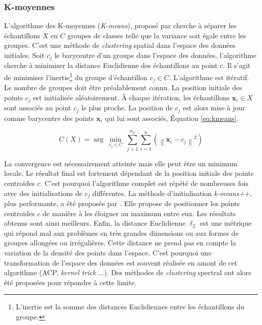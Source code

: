 \subsubsection{K-moyennes} \label{subsubsec:kmeans}
L'algorithme des K-moyennes (\textit{K-means}), proposé par \citeauthor{macqueen_methods_1967} \cite{macqueen_methods_1967, lloyd_least_1982} cherche à séparer les échantillons $X$ en $C$ groupes de classes telle que la variance soit égale entre les groupes.
C'est une méthode de \textit{clustering} spatial dans l'espace des données initiales.
Soit $c_j$ le barycentre d'un groupe dans l'espace des données, l'algorithme cherche à minimiser la distance Euclidienne des échantillons au point $c$.
Il s'agit de minimiser l'inertie\footnote{L'inertie est la somme des distances Euclidiennes entre les échantillons du groupe.} du groupe d'échantillon $c_j \in C$.
L'algorithme est itératif.
Le nombre de groupes doit être préalablement connu.
La position initiale des points $c_j$ est initialisée aléatoirement.
À chaque itération, les échantillons $\mathbf{x}_i \in X$ sont associés au point $c_j$ le plus proche.
La position de $c_j$ est alors mise à jour comme barycentre des points $\mathbf{x}_i$ qui lui sont associés, Équation \ref{eq:kmeans}.

\begin{equation} \label{eq:kmeans}
C(X) = \arg \ \min _{c_{j} \in C} \ \sum_{j=1}^{n_C} \sum_{i=1}^{n} \left(\left\|\mathbf{x}_{i}-c_{j}\right\|^{2}\right)
\end{equation}

La convergence est nécessairement atteinte mais elle peut être un minimum locale.
Le résultat final est fortement dépendant de la position initiale des points centroïdes $c$.
C'est pourquoi l'algorithme complet est répété de nombreuses fois avec des initialisations de $c_j$ différentes.
La méthode d'initialisation \textit{k-means++}, plus performante, a été proposée par \citeauthor{arthur_kmeans_2007} \cite{arthur_kmeans_2007}. Elle propose de positionner les points centroïdes $c$ de manière à les éloigner au maximum entre eux. Les résultats obtenus sont ainsi meilleurs.
Enfin, la distance Euclidienne $\ell_{2}$ est une métrique qui répond mal aux problèmes en très grandes dimensions ou aux formes de groupes allongées ou irrégulières.
Cette distance ne prend pas en compte la variation de la densité des points dans l'espace.
C'est pourquoi une transformation de l'espace des données est souvent réalisée en amont de cet algorithme (ACP, \textit{kernel trick} ...).
Des méthodes de \textit{clustering} spectral ont alors été proposées pour répondre à cette limite.

